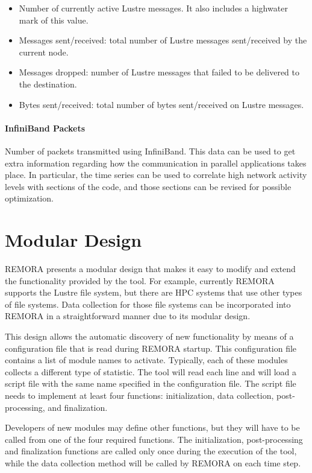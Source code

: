 \documentclass[10pt,a4paper]{report}
\begin{document}
\begin{itemize}
\item Number of currently active Lustre messages. It also includes a highwater mark of this value.
\item Messages sent/received: total number of Lustre messages sent/received by the current node.
\item Messages dropped: number of Lustre messages that failed to be delivered to the destination.
\item Bytes sent/received: total number of bytes sent/received on Lustre messages.
\end{itemize}


\paragraph{InfiniBand Packets}
Number of packets transmitted using InfiniBand. This data can be used to get extra information regarding how the communication in parallel applications takes place. In particular, the time series can be used to correlate high network activity levels with sections of the code, and those sections can be revised for possible optimization.

\FloatBarrier
\section{Modular Design}
REMORA presents a modular design that makes it easy to modify and extend the functionality 
provided by the tool. For example, currently REMORA supports
the Lustre file system, but there are HPC systems that use other types of file systems.
Data collection for those file systems can be incorporated into REMORA in a straightforward
manner due to its modular design.

This design allows the automatic discovery of new functionality by means of a configuration
file that is read during REMORA startup. This configuration file contains
a list of module names to activate. Typically, each of these modules collects a 
different type of statistic. The tool will read each line and will load a
script file with the same name specified in the configuration file. The script file needs
to implement at least four functions: initialization, data collection, post-processing, and 
finalization.

Developers of new modules may define other functions,
but they will have to be called from one of the four required functions. The initialization,
post-processing and finalization functions are called only once during the execution of the
tool, while the data collection method will be called by REMORA on each time step.
\end{document}
